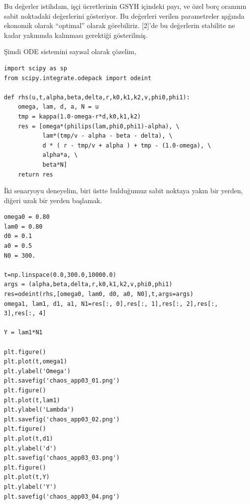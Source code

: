 \documentclass[12pt,fleqn]{article}\usepackage{../../common}
\begin{document}
Bu değerler istihdam, işçi ücretlerinin GSYH içindeki payı, ve özel borç
oranının sabit noktadaki değerlerini gösteriyor. Bu değerleri verilen
parametreler ışığında ekonomik olarak ``optimal'' olarak
görebiliriz. [2]'de bu değerlerin stabilite ne kadar yakınında kalınması
gerektiği gösterilmiş. 

Şimdi ODE sistemini sayısal olarak çözelim,

\begin{verbatim}
import scipy as sp
from scipy.integrate.odepack import odeint

def rhs(u,t,alpha,beta,delta,r,k0,k1,k2,v,phi0,phi1):
    omega, lam, d, a, N = u
    tmp = kappa(1.0-omega-r*d,k0,k1,k2) 
    res = [omega*(philips(lam,phi0,phi1)-alpha), \
           lam*(tmp/v - alpha - beta - delta), \
           d * ( r - tmp/v + alpha ) + tmp - (1.0-omega), \
           alpha*a, \
           beta*N]
    return res           
\end{verbatim}

İki senaryoyu deneyelim, biri üstte bulduğumuz sabit noktaya yakın bir
yerden, diğeri uzak bir yerden başlamak. 

\begin{verbatim}
omega0 = 0.80
lam0 = 0.80
d0 = 0.1
a0 = 0.5
N0 = 300.

t=np.linspace(0.0,300.0,10000.0)
args = (alpha,beta,delta,r,k0,k1,k2,v,phi0,phi1)
res=odeint(rhs,[omega0, lam0, d0, a0, N0],t,args=args)
omega1, lam1, d1, a1, N1=res[:, 0],res[:, 1],res[:, 2],res[:, 3],res[:, 4]

Y = lam1*N1

plt.figure()
plt.plot(t,omega1)
plt.ylabel('Omega')
plt.savefig('chaos_app03_01.png')
plt.figure()
plt.plot(t,lam1)
plt.ylabel('Lambda')
plt.savefig('chaos_app03_02.png')
plt.figure()
plt.plot(t,d1)
plt.ylabel('d')
plt.savefig('chaos_app03_03.png')
plt.figure()
plt.plot(t,Y)
plt.ylabel('Y')
plt.savefig('chaos_app03_04.png')
\end{verbatim}
\end{document}
